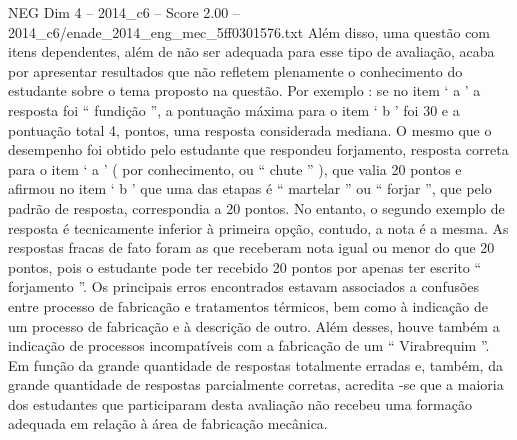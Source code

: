 \begin{textsample}{NEG Dim 4 – 2014\_c6 – Score 2.00 – 2014\_c6/enade\_2014\_eng\_mec\_5ff0301576.txt}
Além disso, uma questão com itens dependentes, além de não ser adequada para esse tipo de avaliação, acaba por apresentar resultados que não refletem plenamente o conhecimento do estudante sobre o tema proposto na questão.
Por exemplo : se no item ‘ a ’ a resposta foi “ fundição ”, a pontuação máxima para o item ‘ b ’ foi 30 e a pontuação total 4, pontos, uma resposta considerada mediana.
O mesmo que o desempenho foi obtido pelo estudante que respondeu forjamento, resposta correta para o item ‘ a ’ ( por conhecimento, ou “ chute ” ), que valia 20 pontos e afirmou no item ‘ b ’ que uma das etapas é “ martelar ” ou “ forjar ”, que pelo padrão de resposta, correspondia a 20 pontos.
No entanto, o segundo exemplo de resposta é tecnicamente inferior à primeira opção, contudo, a nota é a mesma.
As respostas fracas de fato foram as que receberam nota igual ou menor do que 20 pontos, pois o estudante pode ter recebido 20 pontos por apenas ter escrito “ forjamento ”.
Os principais erros encontrados estavam associados a confusões entre processo de fabricação e tratamentos térmicos, bem como à indicação de um processo de fabricação e à descrição de outro.
Além desses, houve também a indicação de processos incompatíveis com a fabricação de um “ Virabrequim ”.
Em função da grande quantidade de respostas totalmente erradas e, também, da grande quantidade de respostas parcialmente corretas, acredita -se que a maioria dos estudantes que participaram desta avaliação não recebeu uma formação adequada em relação à área de fabricação mecânica.

\end{textsample}
